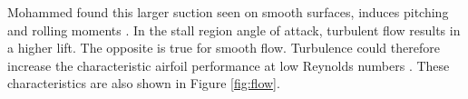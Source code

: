 

Mohammed found this larger suction seen on smooth surfaces, induces pitching and rolling moments \cite{Mohamed2014}. In the stall region angle of attack, turbulent flow results in a higher lift. The opposite is true for smooth flow. Turbulence could therefore increase the characteristic airfoil performance at low Reynolds numbers \cite{Mohamed2014}. These characteristics are also shown in Figure \ref{fig:flow}.


